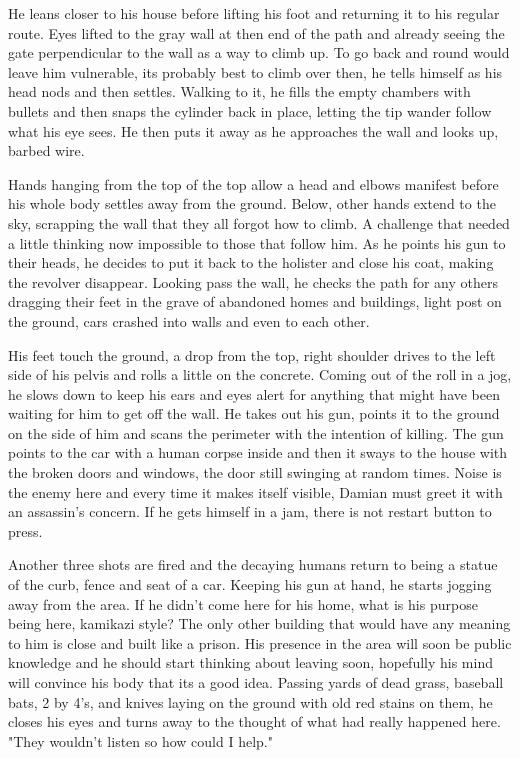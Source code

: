 \begin{Document}
        He leans closer to his house before lifting his foot and returning it to his regular route. Eyes lifted to the gray wall at then end of the path and 
    already seeing the gate perpendicular to the wall as a way to climb up. To go back and round would leave him vulnerable, its probably best to climb over
    then, he tells himself as his head nods and then settles. Walking to it, he fills the empty chambers with bullets and then snaps the cylinder back in place,
    letting the tip wander follow what his eye sees. He then puts it away as he approaches the wall and looks up, barbed wire.

        Hands hanging from the top of the top allow a head and elbows manifest before his whole body settles away from the ground. Below, other hands extend to
    the sky, scrapping the wall that they all forgot how to climb. A challenge that needed a little thinking now impossible to those that follow him. As he points
    his gun to their heads, he decides to put it back to the holister and close his coat, making the revolver disappear. Looking pass the wall, he checks the
    path for any others dragging their feet in the grave of abandoned homes and buildings, light post on the ground, cars crashed into walls and even to each
    other.

        His feet touch the ground, a drop from the top, right shoulder drives to the left side of his pelvis and rolls a little on the concrete. Coming out of the
    roll in a jog, he slows down to keep his ears and eyes alert for anything that might have been waiting for him to get off the wall. He takes out his gun,
    points it to the ground on the side of him and scans the perimeter with the intention of killing. The gun points to the car with a human corpse inside and then
    it sways to the house with the broken doors and windows, the door still swinging at random times. Noise is the enemy here and every time it makes itself 
    visible, Damian must greet it with an assassin's concern. If he gets himself in a jam, there is not restart button to press.

        Another three shots are fired and the decaying humans return to being a statue of the curb, fence and seat of a car. Keeping his gun at hand, he starts
    jogging away from the area. If he didn't come here for his home, what is his purpose being here, kamikazi style? The only other building that would have
    any meaning to him is close and built like a prison.  His presence in the area will soon be public knowledge and he should start thinking about leaving soon,
    hopefully his mind will convince his body that its a good idea. Passing yards of dead grass, baseball bats, 2 by 4's, and knives laying on the ground with
    old red stains on them, he closes his eyes and turns away to the thought of what had really happened here. "They wouldn't listen so how could I help."


\end{Document}
